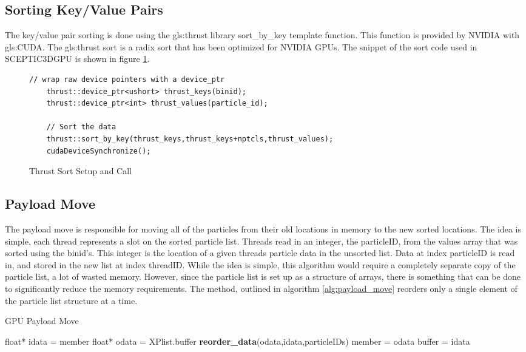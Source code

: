 		\subsection{Sorting Key/Value Pairs}
		The key/value pair sorting is done using the \gls{gls:thrust} library sort\_by\_key template function. This function is provided by NVIDIA with \gls{gls:CUDA}. The \gls{gls:thrust} sort is a radix sort that has been optimized for NVIDIA GPUs\cite{NVIDIACorporation2011a}. The snippet of the sort code used in SCEPTIC3DGPU is shown in figure \ref{fig:thrust_sort}.

\begin{figure}
\begin{lstlisting}[frame=single]
	// wrap raw device pointers with a device_ptr
	thrust::device_ptr<ushort> thrust_keys(binid);
	thrust::device_ptr<int> thrust_values(particle_id);

	// Sort the data
	thrust::sort_by_key(thrust_keys,thrust_keys+nptcls,thrust_values);
	cudaDeviceSynchronize();
\end{lstlisting}
\vspace{-0.4in}
\caption{Thrust Sort Setup and Call}
\label{fig:thrust_sort}
\end{figure}


		\subsection{Payload Move}
		The payload move is responsible for moving all of the particles from their old locations in memory to the new sorted locations. The idea is simple, each thread represents a slot on the sorted particle list. Threads read in an integer, the particleID, from the values array that was sorted using the binid's. This integer is the location of a given threads particle data in the unsorted list. Data at index particleID is read in, and stored in the new list at index threadID. While the idea is simple, this algorithm would require a completely separate copy of the particle list, a lot of wasted memory. However, since the particle list is set up as a structure of arrays, there is something that can be done to significantly reduce the memory requirements. The method, outlined in algorithm \ref{alg:payload_move} reorders only a single element of the particle list structure at a time. 

\begin{algorithm}
	\caption{GPU Payload Move}
	\label{alg:payload_move}
	\begin{algorithmic}
		\STATE float* idata = member
		\STATE float* odata = XPlist.buffer
		\STATE \textbf{reorder\_data}(odata,idata,particleIDs)
		\STATE member = odata
		\STATE buffer = idata
		\ENDFOR
	\end{algorithmic}
\end{algorithm}
  		
